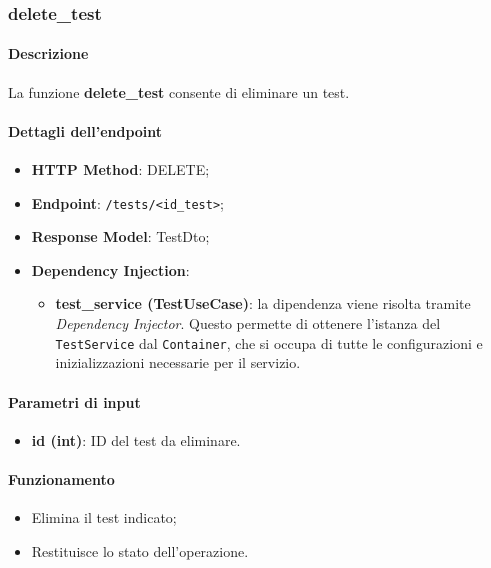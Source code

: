 \subsubsection{delete\_test}
\label{subsubsec:delete_test}

\paragraph{Descrizione}
La funzione \textbf{delete\_test} consente di eliminare un test.

\paragraph{Dettagli dell'endpoint}
\begin{itemize}
    \item \textbf{HTTP Method}: DELETE;
    \item \textbf{Endpoint}: \texttt{/tests/<id\_test>};
    \item \textbf{Response Model}: TestDto;
    \item \textbf{Dependency Injection}: 
    \begin{itemize}
        \item \textbf{test\_service (TestUseCase)}: la dipendenza viene risolta tramite \textit{Dependency Injector}. Questo permette di ottenere l'istanza del \texttt{TestService} dal \texttt{Container}, che si occupa di tutte le configurazioni e inizializzazioni necessarie per il servizio.
    \end{itemize}
\end{itemize}

\paragraph{Parametri di input}
\begin{itemize}
    \item \textbf{id (int)}: ID del test da eliminare.
\end{itemize}

\paragraph{Funzionamento}
\begin{itemize}
    \item Elimina il test indicato;
    \item Restituisce lo stato dell'operazione.
\end{itemize}

